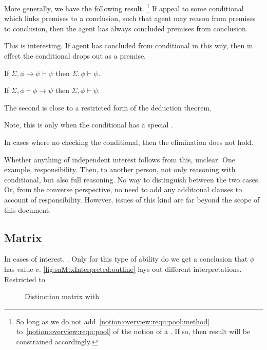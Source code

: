 \begin{note}
  More generally, we have the following result.\nolinebreak
  \footnote{
    So long as we do not add~\autoref{notion:overview:requ:pool:method} to~\autoref{notion:overview:requ:pool} of the notion of a \requ{}.
    If so, then result will be constrained accordingly.
  }
  If appeal to some conditional which links premises to a conclusion, such that agent may reason from premises to conclusion, then the agent has always concluded premises from conclusion.

  This is interesting.
  If agent has concluded from conditional in this way, then in effect the conditional drops out as a premise.

  If \(\Sigma, \phi \rightarrow \psi \vdash \psi\) then \(\Sigma, \phi \vdash \psi\).

  If \(\Sigma, \phi \vdash \phi \rightarrow \psi\) then \(\Sigma, \phi \vdash \psi\).

  The second is close to a restricted form of the deduction theorem.

  Note, this is only when the conditional has a special \requ{}.

  In cases where no checking the conditional, then the elimination does not hold.

  Whether anything of independent interest follows from this, unclear.
  One example, responsibility.
  Then, to another person, not only reasoning with conditional, but also full reasoning.
  No way to distinguish between the two cases.
  Or, from the converse perspective, no need to add any additional clauses to account of responsibility.
  However, issues of this kind are far beyond the scope of this document.
\end{note}

\subsection{Matrix}

\begin{note}
  In cases of interest, .
  Only for this type of ability do we get a conclusion that \(\phi\) has value \(v\).
  \autoref{fig:saMtxInterpreted:outline} lays out different interpretations.
  Restricted to \adB{}
\end{note}

\begin{note}
  \begin{figure}[H]
    \centering
    \saMtxInterpreted{}
    \caption{Distinction matrix with }
    \label{fig:saMtxInterpreted:outline}
  \end{figure}
\end{note}

